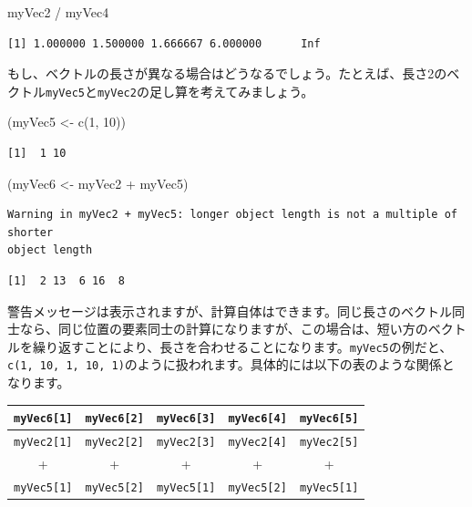 \documentclass[
  a4paper,
  pandoc,
  ja=standard,
  jafont=haranoaji]{bxjsbook}
\newenvironment{Shaded}{\begin{snugshade}}{\end{snugshade}}
\newcommand{\DecValTok}[1]{\textcolor[rgb]{0.68,0.00,0.00}{#1}}
\newcommand{\FunctionTok}[1]{\textcolor[rgb]{0.28,0.35,0.67}{#1}}
\newcommand{\NormalTok}[1]{\textcolor[rgb]{0.00,0.48,0.65}{#1}}
\newcommand{\OtherTok}[1]{\textcolor[rgb]{0.00,0.48,0.65}{#1}}
\newcommand{\SpecialCharTok}[1]{\textcolor[rgb]{0.37,0.37,0.37}{#1}}
\begin{document}
\begin{Shaded}
\begin{Highlighting}[numbers=left,,]
\NormalTok{myVec2 }\SpecialCharTok{/}\NormalTok{ myVec4}
\end{Highlighting}
\end{Shaded}

\begin{verbatim}
[1] 1.000000 1.500000 1.666667 6.000000      Inf
\end{verbatim}

もし、ベクトルの長さが異なる場合はどうなるでしょう。たとえば、長さ2のベクトル\texttt{myVec5}と\texttt{myVec2}の足し算を考えてみましょう。

\begin{Shaded}
\begin{Highlighting}[numbers=left,,]
\NormalTok{(myVec5 }\OtherTok{\textless{}{-}} \FunctionTok{c}\NormalTok{(}\DecValTok{1}\NormalTok{, }\DecValTok{10}\NormalTok{))}
\end{Highlighting}
\end{Shaded}

\begin{verbatim}
[1]  1 10
\end{verbatim}

\begin{Shaded}
\begin{Highlighting}[numbers=left,,]
\NormalTok{(myVec6 }\OtherTok{\textless{}{-}}\NormalTok{ myVec2 }\SpecialCharTok{+}\NormalTok{ myVec5)}
\end{Highlighting}
\end{Shaded}

\begin{verbatim}
Warning in myVec2 + myVec5: longer object length is not a multiple of shorter
object length
\end{verbatim}

\begin{verbatim}
[1]  2 13  6 16  8
\end{verbatim}

警告メッセージは表示されますが、計算自体はできます。同じ長さのベクトル同士なら、同じ位置の要素同士の計算になりますが、この場合は、短い方のベクトルを繰り返すことにより、長さを合わせることになります。\texttt{myVec5}の例だと、\texttt{c(1,\ 10,\ 1,\ 10,\ 1)}のように扱われます。具体的には以下の表のような関係となります。

\begin{longtable}[]{@{}ccccc@{}}
\toprule
\texttt{myVec6{[}1{]}} & \texttt{myVec6{[}2{]}} & \texttt{myVec6{[}3{]}}
& \texttt{myVec6{[}4{]}} & \texttt{myVec6{[}5{]}} \\
\midrule
\endhead
\texttt{myVec2{[}1{]}} & \texttt{myVec2{[}2{]}} & \texttt{myVec2{[}3{]}}
& \texttt{myVec2{[}4{]}} & \texttt{myVec2{[}5{]}} \\
+ & + & + & + & + \\
\texttt{myVec5{[}1{]}} & \texttt{myVec5{[}2{]}} & \texttt{myVec5{[}1{]}}
& \texttt{myVec5{[}2{]}} & \texttt{myVec5{[}1{]}} \\
\bottomrule
\end{longtable}
\end{document}
